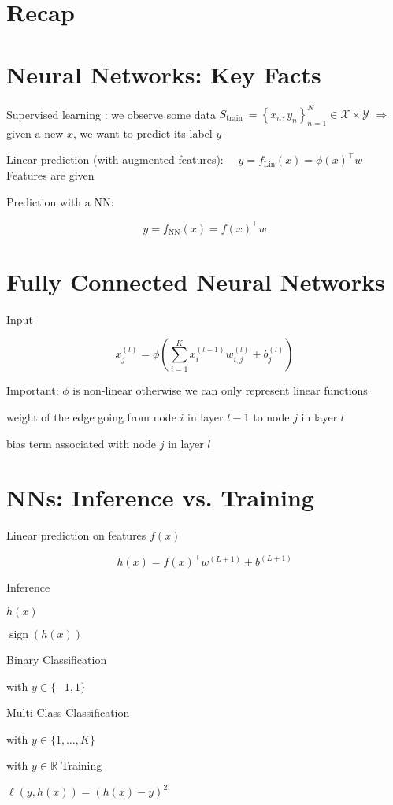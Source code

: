 
\section*{Recap}
\section*{Neural Networks: Key Facts}
Supervised learning : we observe some data $S_{\text {train }}=\left\{x_{n}, y_{n}\right\}_{n=1}^{N} \in \mathscr{X} \times \mathscr{Y}$ $\Rightarrow$ given a new $x$, we want to predict its label $y$

Linear prediction (with augmented features): $\quad y=f_{\operatorname{Lin}}(x)=\phi(x)^{\top} w$ Features are given

Prediction with a NN:

$$
y=f_{\mathrm{NN}}(x)=f(x)^{\top} w
$$

\section*{Fully Connected Neural Networks}
Input

$$
x_{j}^{(l)}=\phi\left(\sum_{i=1}^{K} x_{i}^{(l-1)} w_{i, j}^{(l)}+b_{j}^{(l)}\right)
$$

Important: $\phi$ is non-linear otherwise we can only represent linear functions

weight of the edge going from node $i$ in layer $l-1$ to node $j$ in layer $l$

bias term associated with node $j$ in layer $l$

\section*{NNs: Inference vs. Training}
Linear prediction on features $f(x)$

$$
h(x)=f(x)^{\top} w^{(L+1)}+b^{(L+1)}
$$



Inference

$h(x)$

$\operatorname{sign}(h(x))$

Binary Classification

with $y \in\{-1,1\}$

Multi-Class Classification

with $y \in\{1, \ldots, K\}$

with $y \in \mathbb{R}$
Training

$\ell(y, h(x))=(h(x)-y)^{2}$

